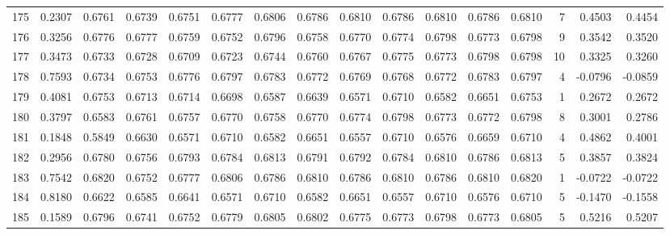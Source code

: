 \begin{tabular}{lrrrrrrrrrrrrrrr}
175 &      0.2307 &  0.6761 &  0.6739 &  0.6751 &  0.6777 &  0.6806 &  0.6786 &  0.6810 &  0.6786 &  0.6810 &   0.6786 &     0.6810 &      7 &                    0.4503 &                     0.4454 \\
176 &      0.3256 &  0.6776 &  0.6777 &  0.6759 &  0.6752 &  0.6796 &  0.6758 &  0.6770 &  0.6774 &  0.6798 &   0.6773 &     0.6798 &      9 &                    0.3542 &                     0.3520 \\
177 &      0.3473 &  0.6733 &  0.6728 &  0.6709 &  0.6723 &  0.6744 &  0.6760 &  0.6767 &  0.6775 &  0.6773 &   0.6798 &     0.6798 &     10 &                    0.3325 &                     0.3260 \\
178 &      0.7593 &  0.6734 &  0.6753 &  0.6776 &  0.6797 &  0.6783 &  0.6772 &  0.6769 &  0.6768 &  0.6772 &   0.6783 &     0.6797 &      4 &                   -0.0796 &                    -0.0859 \\
179 &      0.4081 &  0.6753 &  0.6713 &  0.6714 &  0.6698 &  0.6587 &  0.6639 &  0.6571 &  0.6710 &  0.6582 &   0.6651 &     0.6753 &      1 &                    0.2672 &                     0.2672 \\
180 &      0.3797 &  0.6583 &  0.6761 &  0.6757 &  0.6770 &  0.6758 &  0.6770 &  0.6774 &  0.6798 &  0.6773 &   0.6772 &     0.6798 &      8 &                    0.3001 &                     0.2786 \\
181 &      0.1848 &  0.5849 &  0.6630 &  0.6571 &  0.6710 &  0.6582 &  0.6651 &  0.6557 &  0.6710 &  0.6576 &   0.6659 &     0.6710 &      4 &                    0.4862 &                     0.4001 \\
182 &      0.2956 &  0.6780 &  0.6756 &  0.6793 &  0.6784 &  0.6813 &  0.6791 &  0.6792 &  0.6784 &  0.6810 &   0.6786 &     0.6813 &      5 &                    0.3857 &                     0.3824 \\
183 &      0.7542 &  0.6820 &  0.6752 &  0.6777 &  0.6806 &  0.6786 &  0.6810 &  0.6786 &  0.6810 &  0.6786 &   0.6810 &     0.6820 &      1 &                   -0.0722 &                    -0.0722 \\
184 &      0.8180 &  0.6622 &  0.6585 &  0.6641 &  0.6571 &  0.6710 &  0.6582 &  0.6651 &  0.6557 &  0.6710 &   0.6576 &     0.6710 &      5 &                   -0.1470 &                    -0.1558 \\
185 &      0.1589 &  0.6796 &  0.6741 &  0.6752 &  0.6779 &  0.6805 &  0.6802 &  0.6775 &  0.6773 &  0.6798 &   0.6773 &     0.6805 &      5 &                    0.5216 &                     0.5207 \\

\end{tabular}
